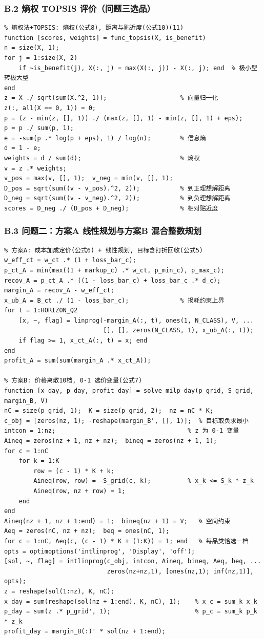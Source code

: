 \subsubsection*{B.2 熵权 TOPSIS 评价（问题三选品）}

\begin{lstlisting}
% 熵权法+TOPSIS: 熵权(公式8), 距离与贴近度(公式10)(11)
function [scores, weights] = func_topsis(X, is_benefit)
n = size(X, 1);
for j = 1:size(X, 2)
    if ~is_benefit(j), X(:, j) = max(X(:, j)) - X(:, j); end  % 极小型转极大型
end
z = X ./ sqrt(sum(X.^2, 1));                    % 向量归一化
z(:, all(X == 0, 1)) = 0;
p = (z - min(z, [], 1)) ./ (max(z, [], 1) - min(z, [], 1) + eps);
p = p ./ sum(p, 1);
e = -sum(p .* log(p + eps), 1) / log(n);        % 信息熵
d = 1 - e;
weights = d / sum(d);                           % 熵权
v = z .* weights;
v_pos = max(v, [], 1);  v_neg = min(v, [], 1);
D_pos = sqrt(sum((v - v_pos).^2, 2));           % 到正理想解距离
D_neg = sqrt(sum((v - v_neg).^2, 2));           % 到负理想解距离
scores = D_neg ./ (D_pos + D_neg);              % 相对贴近度
\end{lstlisting}

\subsubsection*{B.3 问题二：方案A 线性规划与方案B 混合整数规划}

\begin{lstlisting}
% 方案A: 成本加成定价(公式6) + 线性规划, 目标含打折回收(公式5)
w_eff_ct = w_ct .* (1 + loss_bar_c);
p_ct_A = min(max((1 + markup_c) .* w_ct, p_min_c), p_max_c);
recov_A = p_ct_A .* ((1 - loss_bar_c) + loss_bar_c .* d_c);
margin_A = recov_A - w_eff_ct;
x_ub_A = B_ct ./ (1 - loss_bar_c);              % 损耗约束上界
for t = 1:HORIZON_Q2
    [x, ~, flag] = linprog(-margin_A(:, t), ones(1, N_CLASS), V, ...
                           [], [], zeros(N_CLASS, 1), x_ub_A(:, t));
    if flag >= 1, x_ct_A(:, t) = x; end
end
profit_A = sum(sum(margin_A .* x_ct_A));

% 方案B: 价格离散10档, 0-1 选价变量(公式7)
function [x_day, p_day, profit_day] = solve_milp_day(p_grid, S_grid, margin_B, V)
nC = size(p_grid, 1);  K = size(p_grid, 2);  nz = nC * K;
c_obj = [zeros(nz, 1); -reshape(margin_B', [], 1)];  % 目标取负求最小
intcon = 1:nz;                                    % z 为 0-1 变量
Aineq = zeros(nz + 1, nz + nz);  bineq = zeros(nz + 1, 1);
for c = 1:nC
    for k = 1:K
        row = (c - 1) * K + k;
        Aineq(row, row) = -S_grid(c, k);          % x_k <= S_k * z_k
        Aineq(row, nz + row) = 1;
    end
end
Aineq(nz + 1, nz + 1:end) = 1;  bineq(nz + 1) = V;   % 空间约束
Aeq = zeros(nC, nz + nz);  beq = ones(nC, 1);
for c = 1:nC, Aeq(c, (c - 1) * K + (1:K)) = 1; end   % 每品类恰选一档
opts = optimoptions('intlinprog', 'Display', 'off');
[sol, ~, flag] = intlinprog(c_obj, intcon, Aineq, bineq, Aeq, beq, ...
                            zeros(nz+nz,1), [ones(nz,1); inf(nz,1)], opts);
z = reshape(sol(1:nz), K, nC);
x_day = sum(reshape(sol(nz + 1:end), K, nC), 1);    % x_c = sum_k x_k
p_day = sum(z .* p_grid', 1);                       % p_c = sum_k p_k * z_k
profit_day = margin_B(:)' * sol(nz + 1:end);
\end{lstlisting}

